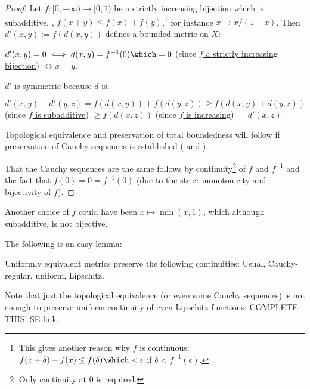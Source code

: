 	\begin{proof}
		Let $f\colon[0, +\infty)\to [0, 1)$ be a strictly increasing bijection which is subadditive, \ie, $f(x + y)\le f(x) + f(y)$,\footnote{
			This gives another reason why $f$ is continuous: $f(x + \delta) - f(x)\le f(\delta) \which < \epsilon$ if $\delta < f^{-1}(\epsilon)$.
		} for instance $x\mapsto x/(1 + x)$. Then $d'(x, y) := f(d(x, y))$ defines a bounded metric on $X$:
		\begin{prooflist}
			\item $d'(x, y) = 0\iff d(x, y) = f^{-1}(0)\which = 0$ (since \uline{$f$ a strictly increasing bijection}) $\iff x = y$.
			
			\item $d'$ is symmetric because $d$ is.
			
			\item $d'(x, y) + d'(y, z) = f(d(x, y)) + f(d(y, z))\ge f(d(x, y) + d(y, z))$ (since \uline{$f$ is subadditive}) $\ge f(d(x, z))$ (since \uline{$f$ is increasing}) $ = d'(x, z)$.
		\end{prooflist}
		
		Topological equivalence and preservation of total boundedness will follow if preservation of Cauchy sequences is established ( and \resp {}).
		
		That the Cauchy sequences are the same follows by continuity\footnote{
			Only continuity at $0$ is required.
		} of $f$ and $f^{-1}$ and the fact that $f(0) = 0 = f^{-1}(0)$ (due to the \uline{strict monotonicity and bijectivity of $f$}).
	\end{proof}
	
	\begin{rmk}
		Another choice of $f$ could have been $x\mapsto \min(x, 1)$, which although subadditive, is not bijective.
	\end{rmk}
	
	
	The following is an easy lemma:
	
	\begin{lem}
		Uniformly equivalent metrics preserve the following continuities: Usual, Cauchy-regular, uniform, Lipschitz.
	\end{lem}
	
	\begin{rmk}
		Note that just the topological equivalence (or even same Cauchy sequences) is not enough to preserve uniform continuity of even Lipschitz functions: COMPLETE THIS! \href{https://math.stackexchange.com/questions/1963784/uniform-continuity-preserved-with-equivalent-metrics}{SE link.}
	\end{rmk}
	



